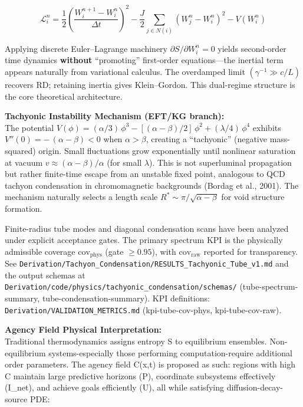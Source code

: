 \documentclass[
]{article}
\begin{document}
\[\mathcal{L}_i^n = \frac{1}{2}\left(\frac{W_i^{n+1} - W_i^n}{\Delta t}\right)^2 - \frac{J}{2}\sum_{j \in N(i)}(W_j^n - W_i^n)^2 - V(W_i^n)\]

Applying discrete Euler--Lagrange machinery
\(\partial S/\partial W_i^{n} = 0\) yields second-order time dynamics
\textbf{without} ``promoting'' first-order equations---the inertial term
appears naturally from variational calculus. The overdamped limit
\((\gamma^{-1} \gg c/L)\) recovers RD; retaining inertia gives
Klein--Gordon. This dual-regime structure is the core theoretical
architecture.

\textbf{Tachyonic Instability Mechanism (EFT/KG branch):}\\
The potential
\(V(\phi) = (\alpha/3)\,\phi^{3} - [(\alpha-\beta)/2]\,\phi^{2} + (\lambda/4)\,\phi^{4}\)
exhibits \(V''(0) = -\,(\alpha-\beta) < 0\) when \(\alpha > \beta\),
creating a ``tachyonic'' (negative mass-squared) origin. Small
fluctuations grow exponentially until nonlinear saturation at vacuum
\(v \approx (\alpha-\beta)/\alpha\) (for small \(\lambda\)). This is not
superluminal propagation but rather finite-time escape from an unstable
fixed point, analogous to QCD tachyon condensation in chromomagnetic
backgrounds (Bordag et al., 2001). The mechanism naturally selects a
length scale \(R^{\ast} \sim \pi/\sqrt{\alpha-\beta}\) for void
structure formation.

Finite-radius tube modes and diagonal condensation scans have been
analyzed under explicit acceptance gates. The primary spectrum KPI is
the physically admissible coverage \(\mathrm{cov}_{\mathrm{phys}}\)
(gate \(\ge 0.95\)), with \(\mathrm{cov}_{\mathrm{raw}}\) reported for
transparency. See
\texttt{Derivation/Tachyon\_Condensation/RESULTS\_Tachyonic\_Tube\_v1.md}
and the output schemas at
\texttt{Derivation/code/physics/tachyonic\_condensation/schemas/}
(tube-spectrum-summary, tube-condensation-summary). KPI definitions:
\texttt{Derivation/VALIDATION\_METRICS.md} (kpi-tube-cov-phys,
kpi-tube-cov-raw).

\textbf{Agency Field Physical Interpretation:}\\
Traditional thermodynamics assigns entropy S to equilibrium ensembles.
Non-equilibrium systems-especially those performing computation-require
additional order parameters. The agency field C(x,t) is proposed as
such: regions with high C maintain large predictive horizons (P),
coordinate subsystems effectively (I\_net), and achieve goals
efficiently (U), all while satisfying diffusion-decay-source PDE:
\end{document}
